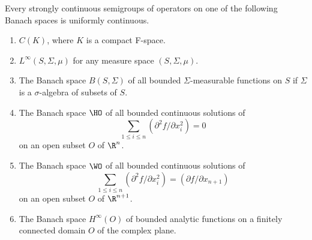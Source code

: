 \begin{theorem}\label{thm:a2-3.6}
Every strongly continuous semigroups of operators on one of the following Banach spaces is uniformly continuous.
\begin{enumerate}[\upshape (i)]
\item \label{thm:a2-3.6-1}
$C(K)$, where $K$ is a compact F-space.
\item \label{thm:a2-3.6-2}
$L^{\infty}(S,\Sigma,\mu)$ for any measure space $(S,\Sigma,\mu)$.
\item \label{thm:a2-3.6-3}
The Banach space $B(S,\Sigma)$ of all bounded $\Sigma$-measurable functions on $S$ if  $\Sigma$ is a  $\sigma$-algebra of subsets of\/ $S$.
\item \label{thm:a2-3.6-4}
The Banach space $\HO$ of all bounded continuous solutions of
\[
\sum_{1 \leq i \leq n} (\partial^2f/\partial x_i^2) = 0
\]
on an open subset $O$ of\/ $\R^n$.
\item \label{thm:a2-3.6-5}
The Banach space $\WO$ of all bounded continuous solutions of
\[
\sum_{1 \leq i \leq n} (\partial^2f/\partial x_i^2) = (\partial f/\partial x_{n+1})
\]
on an open subset $O$ of  $\R^{n+1}$.
\item \label{thm:a2-3.6-6}
The Banach space $H^{\infty}(O)$ of bounded analytic functions on a finitely connected domain $O$ of the complex plane.
\end{enumerate}
\end{theorem}
